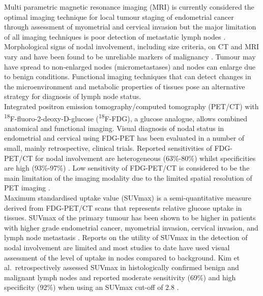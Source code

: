 \documentclass[sn-standardnature]{sn-jnl}
\theoremstyle{thmstyleone}%
\theoremstyle{thmstyletwo}%
\theoremstyle{thmstylethree}%
\begin{document}
Multi parametric magnetic resonance imaging (MRI) is currently considered the optimal imaging technique for local tumour staging of endometrial cancer through assessment of myometrial and cervical invasion but the major limitation of all imaging techniques is poor detection of metastatic lymph nodes 
\cite{moriceEndometrialCancer2016}. 
Morphological signs of nodal involvement, including size criteria, on CT and MRI vary and have been found to be unreliable markers of malignancy
\cite{salaRoleDynamicContrastenhanced2010}. 
Tumour may have spread to non-enlarged nodes (micrometastases) and nodes can enlarge due to benign conditions. Functional imaging techniques that can detect changes in the microenvironment and metabolic properties of tissues pose an alternative strategy for diagnosis of lymph node status. \\

Integrated positron emission tomography/computed tomography (PET/CT) with \textsuperscript{18}F-fluoro-2-deoxy-D-glucose (\textsuperscript{18}F-FDG), a glucose analogue, allows combined anatomical and functional imaging. Visual diagnosis of nodal status in endometrial and cervical using FDG-PET has been evaluated in a number of small, mainly retrospective, clinical trials. Reported sensitivities of FDG-PET/CT for nodal involvement are heterogeneous (63\%-80\%) whilst specificities are high (93\%-97\%)
\cite{bollineniHighDiagnosticValue2016,huDiagnosticAccuracyPreoperative2019}. 
Low sensitivity of FDG-PET/CT is considered to be the main limitation of the imaging modality due to the limited spatial resolution of PET imaging
\cite{garauRole18FFDGPET2020}. \\

Maximum standardised uptake value (SUVmax) is a semi-quantitative measure derived from FDG-PET/CT scans that represents relative glucose uptake in tissues. SUVmax of the primary tumour has been shown to be higher in patients with higher grade endometrial cancer, myometrial invasion, cervical invasion, and lymph node metastasis  
\cite{antonsenSUVmax18FDGPET2013,husbyMetabolicTumorVolume2015}. 
Reports on the utility of SUVmax in the detection of nodal involvement are limited and most studies to date have used visual assessment of the level of uptake in nodes compared to background.
Kim et al.\ retrospectively assessed SUVmax in histologically confirmed benign and malignant lymph nodes and reported moderate sensitivity (69\%) and high specificity (92\%) when using an SUVmax cut-off of 2.8 
\cite{kimComparisonFDGPET2016}. \\
\end{document}
